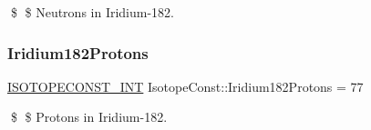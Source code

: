 \$ \$ Neutrons in Iridium-\/182. \mbox{\label{group___isotope_const-_iridium-_ir182_ga7036bb3d763cc69754fbcff4b23de615}} 
\subsubsection{\texorpdfstring{Iridium182\+Protons}{Iridium182Protons}}
{\footnotesize\ttfamily \mbox{\hyperlink{group___isotope_const-_macros_ga5f18360b3e99483a35c32d789e62621c}{I\+S\+O\+T\+O\+P\+E\+C\+O\+N\+S\+T\+\_\+\+I\+NT}} Isotope\+Const\+::\+Iridium182\+Protons = 77}

\$ \$ Protons in Iridium-\/182. 